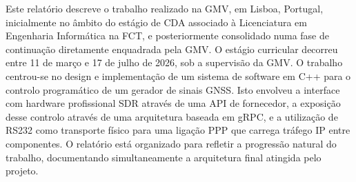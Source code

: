
Este relatório descreve o trabalho realizado na \gls{GMV}, em Lisboa,
Portugal, inicialmente no âmbito do estágio de \gls{CDA} associado à
Licenciatura em Engenharia Informática na \gls{FCT}, e posteriormente
consolidado numa fase de continuação diretamente enquadrada pela
\gls{GMV}. O estágio curricular decorreu entre 11 de março e 17 de julho de
2026, sob a supervisão da \gls{GMV}. O trabalho centrou-se no design e
implementação de um sistema de software em C++ para o controlo programático de
um gerador de sinais \gls{GNSS}. Isto envolveu a interface com
hardware profissional \gls{SDR} através de uma API de fornecedor, a exposição
desse controlo através de uma arquitetura baseada em gRPC, e a utilização de
\gls{RS232} como transporte físico para uma ligação \gls{PPP} que carrega
tráfego IP entre componentes. O relatório está organizado para refletir a
progressão natural do trabalho, documentando simultaneamente a arquitetura
final atingida pelo projeto.

